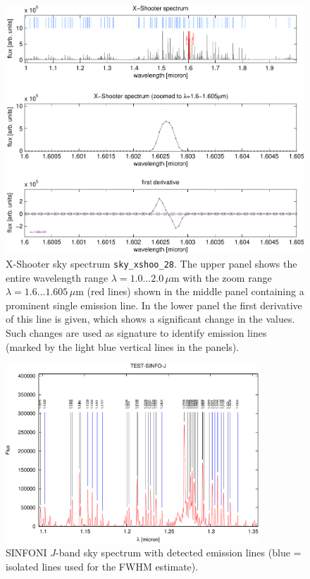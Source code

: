 \begin{figure}
\centering
\includegraphics[width=17cm,clip=true]
{figures/X-Shooter_spec_deriv_1_6-1_605.pdf}
\caption[]{X-Shooter sky spectrum {\tt sky\_xshoo\_28}. The upper panel shows
the entire wavelength range $\lambda=1.0...2.0\,\mu$m with the zoom range
$\lambda=1.6...1.605\,\mu$m (red lines) shown in the middle panel containing a
prominent single emission line. In the lower panel the first derivative of this
line is given, which shows a significant change in the values. Such changes
are used as signature to identify emission lines (marked by the light blue
vertical lines in the panels).}
\label{fig:xshoo1}
\end{figure}

\begin{figure}
\centering
\includegraphics[width=9.5cm,clip=true]
{figures/TEST-SINFO-J_with_lines.pdf}
\caption[]{SINFONI $J$-band sky spectrum with detected emission lines
(blue = isolated lines used for the FWHM estimate).}
\label{fig:sinfoj1}
\end{figure}

